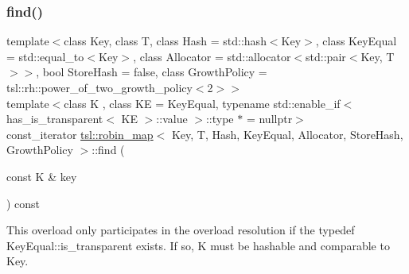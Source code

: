 \subsubsection{\texorpdfstring{find()}{find()}\hspace{0.1cm}{\footnotesize\ttfamily [5/6]}}
{\footnotesize\ttfamily template$<$class Key, class T, class Hash = std\+::hash$<$\+Key$>$, class Key\+Equal = std\+::equal\+\_\+to$<$\+Key$>$, class Allocator = std\+::allocator$<$std\+::pair$<$\+Key, T$>$$>$, bool Store\+Hash = false, class Growth\+Policy = tsl\+::rh\+::power\+\_\+of\+\_\+two\+\_\+growth\+\_\+policy$<$2$>$$>$ \\
template$<$class K , class KE  = Key\+Equal, typename std\+::enable\+\_\+if$<$ has\+\_\+is\+\_\+transparent$<$ K\+E $>$\+::value $>$\+::type $\ast$  = nullptr$>$ \\
const\+\_\+iterator \mbox{\hyperlink{classtsl_1_1robin__map}{tsl\+::robin\+\_\+map}}$<$ Key, T, Hash, Key\+Equal, Allocator, Store\+Hash, Growth\+Policy $>$\+::find (\begin{DoxyParamCaption}\item[{const K \&}]{key }\end{DoxyParamCaption}) const\hspace{0.3cm}{\ttfamily [inline]}}





This overload only participates in the overload resolution if the typedef Key\+Equal\+::is\+\_\+transparent exists. If so, K must be hashable and comparable to Key. \mbox{\label{classtsl_1_1robin__map_ad16d4cd56cab57cf373a87aa37b29148}} 
